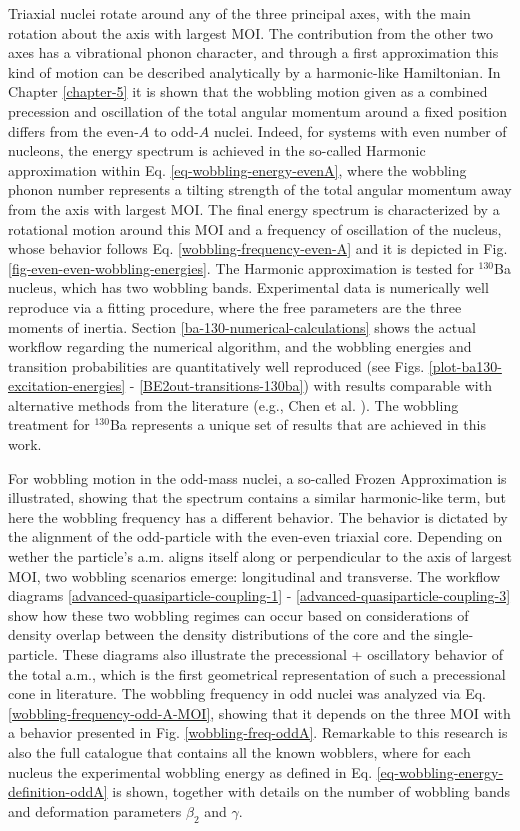 Triaxial nuclei rotate around any of the three principal axes, with the main rotation about the axis with largest MOI. The contribution from the other two axes has a vibrational phonon character, and through a first approximation this kind of motion can be described analytically by a harmonic-like Hamiltonian. In Chapter \ref{chapter-5} it is shown that the wobbling motion given as a combined precession and oscillation of the total angular momentum around a fixed position differs from the even-$A$ to odd-$A$ nuclei. Indeed, for systems with even number of nucleons, the energy spectrum is achieved in the so-called Harmonic approximation within Eq. \ref{eq-wobbling-energy-evenA}, where the wobbling phonon number represents a tilting strength of the total angular momentum away from the axis with largest MOI. The final energy spectrum is characterized by a rotational motion around this MOI and a frequency of oscillation of the nucleus, whose behavior follows Eq. \ref{wobbling-frequency-even-A} and it is depicted in Fig. \ref{fig-even-even-wobbling-energies}. The Harmonic approximation is tested for $^{130}$Ba nucleus, which has two wobbling bands. Experimental data is numerically well reproduce via a fitting procedure, where the free parameters are the three moments of inertia. Section \ref{ba-130-numerical-calculations} shows the actual workflow regarding the numerical algorithm, and the wobbling energies and transition probabilities are quantitatively well reproduced (see Figs. \ref{plot-ba130-excitation-energies} - \ref{BE2out-transitions-130ba}) with results comparable with alternative methods from the literature (e.g., Chen et al. \cite{chen2019transverse}). The wobbling treatment for $^{130}$Ba represents a unique set of results that are achieved in this work.

For wobbling motion in the odd-mass nuclei, a so-called Frozen Approximation is illustrated, showing that the spectrum contains a similar harmonic-like term, but here the wobbling frequency has a different behavior. The behavior is dictated by the alignment of the odd-particle with the even-even triaxial core. Depending on wether the particle's a.m. aligns itself along or perpendicular to the axis of largest MOI, two wobbling scenarios emerge: longitudinal and transverse. The workflow diagrams \ref{advanced-quasiparticle-coupling-1} - \ref{advanced-quasiparticle-coupling-3} show how these two wobbling regimes can occur based on considerations of density overlap between the density distributions of the core and the single-particle. These diagrams also illustrate the precessional + oscillatory behavior of the total a.m., which is the first geometrical representation of such a precessional cone in literature. The wobbling frequency in odd nuclei was analyzed via Eq. \ref{wobbling-frequency-odd-A-MOI}, showing that it depends on the three MOI with a behavior presented in Fig. \ref{wobbling-freq-oddA}. Remarkable to this research is also the full catalogue that contains all the known wobblers, where for each nucleus the experimental wobbling energy as defined in Eq. \ref{eq-wobbling-energy-definition-oddA} is shown, together with details on the number of wobbling bands and deformation parameters $\beta_2$ and $\gamma$.

